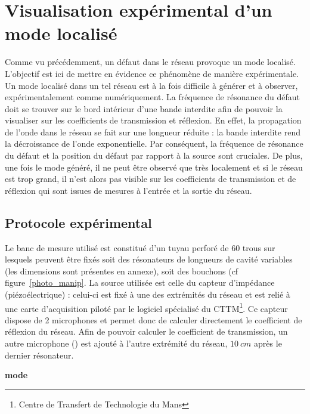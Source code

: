 \chapter{Visualisation expérimental d'un mode localisé}
Comme vu précédemment, un défaut dans le réseau provoque un mode localisé. L'objectif est ici de mettre en évidence ce phénomène de manière expérimentale.\\


Un mode localisé dans un tel réseau est à la fois difficile à générer et à observer, expérimentalement comme numériquement. La fréquence de résonance du défaut doit se trouver sur le bord intérieur d'une bande interdite afin de pouvoir la visualiser sur les coefficients de transmission et réflexion. En effet, la propagation de l'onde dans le réseau se fait sur une longueur réduite : la bande interdite rend la décroissance de l'onde exponentielle. Par conséquent, la fréquence de résonance du défaut et la position du défaut par rapport à la source sont cruciales. De plus, une fois le mode généré, il ne peut être observé que très localement et si le réseau est trop grand, il n'est alors pas visible sur les coefficients de transmission et de réflexion qui sont issues de mesures à l'entrée et la sortie du réseau.


\section{Protocole expérimental}
Le banc de mesure utilisé est constitué d'un tuyau perforé de 60 trous sur lesquels peuvent être fixés soit des résonateurs de longueurs de cavité variables (les dimensions sont présentes en annexe), soit des bouchons (cf figure~\ref{photo_manip}. La source utilisée est celle du capteur d'impédance (piézoélectrique) : celui-ci est fixé à une des extrémités du réseau et est relié à une carte d'acquisition piloté par le logiciel spécialisé du CTTM\footnote{Centre de Transfert de Technologie du Mans}. Ce capteur dispose de 2 microphones et permet donc de calculer directement le coefficient de réflexion du réseau. Afin de pouvoir calculer le coefficient de transmission, un autre microphone (\textcolor[red]{reference mic + ampli}) est ajouté à l'autre extrémité du réseau, $10~cm$ après le dernier résonateur.


\textbf{mode }


